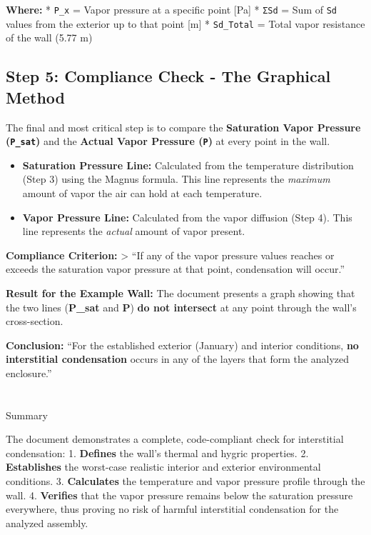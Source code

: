 \documentclass[
  10pt,
  letterpaper,
]{scrbook}
\providecommand{\tightlist}{%
  \setlength{\itemsep}{0pt}\setlength{\parskip}{0pt}}
\begin{document}
\textbf{Where:} * \texttt{P\_x} = Vapor pressure at a specific point
{[}Pa{]} * \texttt{ΣSd} = Sum of \texttt{Sd} values from the exterior up
to that point {[}m{]} * \texttt{Sd\_Total} = Total vapor resistance of
the wall (5.77 m)

\subsection{Step 5: Compliance Check - The Graphical
Method}\label{step-5-compliance-check---the-graphical-method}

The final and most critical step is to compare the \textbf{Saturation
Vapor Pressure (\texttt{P\_sat})} and the \textbf{Actual Vapor Pressure
(\texttt{P})} at every point in the wall.

\begin{itemize}
\tightlist
\item
  \textbf{Saturation Pressure Line:} Calculated from the temperature
  distribution (Step 3) using the Magnus formula. This line represents
  the \emph{maximum} amount of vapor the air can hold at each
  temperature.
\item
  \textbf{Vapor Pressure Line:} Calculated from the vapor diffusion
  (Step 4). This line represents the \emph{actual} amount of vapor
  present.
\end{itemize}

\textbf{Compliance Criterion:} \textgreater{} ``If any of the vapor
pressure values reaches or exceeds the saturation vapor pressure at that
point, condensation will occur.''

\textbf{Result for the Example Wall:} The document presents a graph
showing that the two lines (\textbf{P\_sat} and \textbf{P}) \textbf{do
not intersect} at any point through the wall's cross-section.

\textbf{Conclusion:} ``For the established exterior (January) and
interior conditions, \textbf{no interstitial condensation} occurs in any
of the layers that form the analyzed enclosure.''

\section{}\label{section}

Summary

The document demonstrates a complete, code-compliant check for
interstitial condensation: 1. \textbf{Defines} the wall's thermal and
hygric properties. 2. \textbf{Establishes} the worst-case realistic
interior and exterior environmental conditions. 3. \textbf{Calculates}
the temperature and vapor pressure profile through the wall. 4.
\textbf{Verifies} that the vapor pressure remains below the saturation
pressure everywhere, thus proving no risk of harmful interstitial
condensation for the analyzed assembly.
\end{document}
